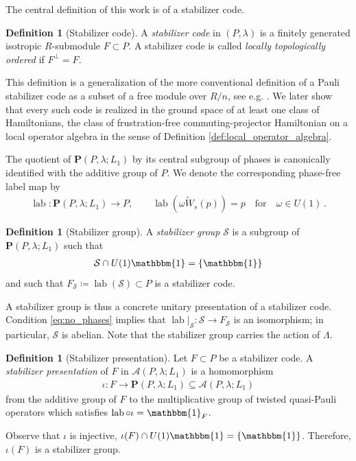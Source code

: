 \documentclass[sn-mathphys-num]{sn-jnl}
\theoremstyle{definition}
\newtheorem{definition}[lemma]{Definition}
\numberwithin{equation}{section}
\theoremstyle{definition}
\def\CA{{\mathcal A}}
\def\CS {{\mathcal S}}
\def\La{{\Lambda}}
\def\l{{\lambda}}
\def\lab{\operatorname{lab}}
\newcommand{\id}{\mathbbm{1}}
\begin{document}
The central definition of this work is of a stabilizer code. 
\begin{definition}[Stabilizer code]\label{def:stabilizer_code}
A \textit{stabilizer code} in $(P,\l)$ is a finitely generated
isotropic $R$-submodule $F\subset P$. A stabilizer code is called \textit{locally topologically ordered} if $F^{\perp}=F$.
\end{definition}
This definition is a generalization of the more conventional definition of a Pauli stabilizer code as a subset of a free module over $R/n$, see e.g. \cite{haah2013,haah2021classification}. We later show that every such code is realized in the ground space of at least one class of Hamiltonians, the class of frustration-free commuting-projector Hamiltonian on a local operator algebra in the sense of Definition \ref{def:local_operator_algebra}.

The quotient of $\textbf{P}(P,\l;L_1)$ by its central subgroup of phases is
canonically identified with the additive group of $P$. We denote the
corresponding phase-free label map by
\begin{align}
    \operatorname{lab}:\textbf{P}(P,\l;L_1)\longrightarrow P,
    \qquad
    \operatorname{lab}(\omega\widetilde W_s(p))=p\quad \mbox{for}\quad \omega\in U(1)\,.
\end{align}

\begin{definition}[Stabilizer group]
\label{def:stabilizer_group}
A \textit{stabilizer group} $\CS$ is a subgroup of
$\textbf{P}(P,\l;L_1)$ such that
\begin{align}\label{eq:no_phases}
    \CS\cap U(1)\id=\{\id\}
\end{align}
and such that $F_{\CS}\coloneqq\lab(\CS)\subset P$ is a stabilizer code. 
\end{definition}
A stabilizer group is thus a concrete unitary presentation of a stabilizer code. Condition \eqref{eq:no_phases} implies that
$\lab|_{\CS}:\CS\to F_{\CS}$ is an isomorphism; in particular, $\CS$ is
abelian. Note that the stabilizer group carries the action of $\La$.

\begin{definition}[Stabilizer presentation]
    Let $F\subset P$ be a stabilizer code. A \textit{stabilizer presentation} of $F$ in $\CA(P,\l;L_1)$ is a homomorphism 
\begin{align}\label{eq:splitting_over_code}
    \iota:F\longrightarrow
    \textbf{P}(P,\l;L_1)\subseteq\CA(P,\l;L_1)
\end{align}
from the additive group of $F$ to the multiplicative group of twisted quasi-Pauli operators which  satisfies $\operatorname{lab}\circ\iota=\id_{F}$.
\end{definition}
      Observe that $\iota$ is injective, $\iota(F)\cap U(1)\id =\{\id\}$. Therefore, $\iota(F)$ is a stabilizer group.
\end{document}

